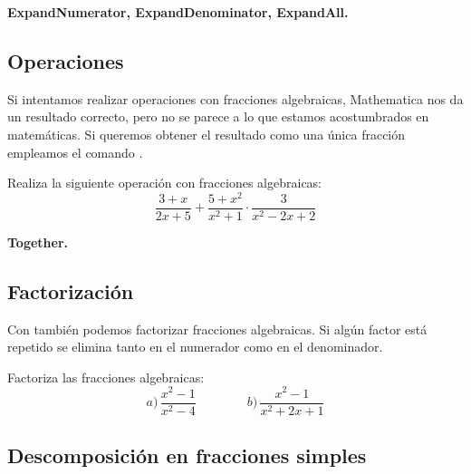 \documentclass[a4paper,10pt, draft]{article}
\newcommand{\com}[1]{\textbf{\color{blue}{#1}}}
\newenvironment{ejer}{\begin{tcolorbox}[center title, title=Ejercicios,
fonttitle=\sffamily\bfseries,colback=blue!5,colframe=orange]}{\end{tcolorbox}}
\newenvironment{funciones}{\begin{tcolorbox}[center title, title=Nuevas funciones, fonttitle=\sffamily\bfseries, colback=green!5!white,colframe=red!75!black]}{\end{tcolorbox}\bigskip}
\begin{document}
\begin{funciones}

\textbf{ExpandNumerator, ExpandDenominator, ExpandAll.}


\end{funciones}



\newpage

\subsection{Operaciones}

Si intentamos realizar operaciones con fracciones algebraicas, Mathematica nos da un resultado correcto, pero no se parece a lo que estamos acostumbrados en matemáticas. Si queremos obtener el resultado como una única fracción empleamos el comando \com{Together[p]}.

\begin{ejer}

Realiza la siguiente operación con fracciones algebraicas:
$$
\frac{3+x}{2x+5} + \frac{5+x^2}{x^2+1} \cdot \frac{3}{x^2-2x+2}
$$

\end{ejer}  

\begin{funciones}

\textbf{Together.}


\end{funciones}





\newpage

\subsection{Factorización}

Con \com{Factor[p]} también podemos factorizar fracciones algebraicas. Si algún factor está repetido se elimina tanto en el numerador como en el denominador.

\begin{ejer}

Factoriza las fracciones algebraicas:
$$
a)\, \frac{x^2-1}{x^2-4} \qquad \qquad b)\, \frac{x^2-1}{x^2+2x+1}
$$

\end{ejer} 

 \newpage


\subsection{Descomposición en fracciones simples}
\end{document}
